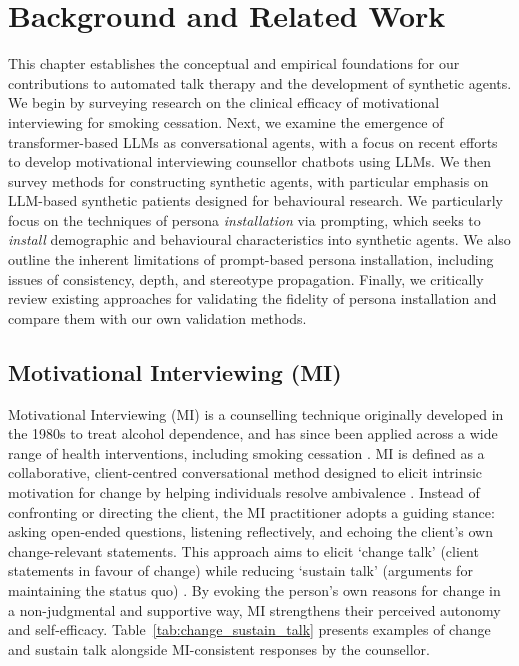 \chapter{Background and Related Work}
\label{ch:background}
This chapter establishes the conceptual and empirical foundations for our contributions to automated talk therapy and the development of synthetic agents. We begin by surveying research on the clinical efficacy of motivational interviewing for smoking cessation. Next, we examine the emergence of transformer-based LLMs as conversational agents, with a focus on recent efforts to develop motivational interviewing counsellor chatbots using LLMs. We then survey methods for constructing synthetic agents, with particular emphasis on LLM-based synthetic patients designed for behavioural research. We particularly focus on the techniques of persona \emph{installation} via prompting, which seeks to \emph{install} demographic and behavioural characteristics into synthetic agents. We also outline the inherent limitations of prompt-based persona installation, including issues of consistency, depth, and stereotype propagation. Finally, we critically review existing approaches for validating the fidelity of persona installation and compare them with our own validation methods.


\section{Motivational Interviewing (MI)}
Motivational Interviewing (MI) is a counselling technique originally developed in the 1980s to treat alcohol dependence, and has since been applied across a wide range of health interventions, including smoking cessation \cite{Miller1983, MillerRollnick2023}. MI is defined as a collaborative, client-centred conversational method designed to elicit intrinsic motivation for change by helping individuals resolve ambivalence \cite{MillerRollnick2002}. Instead of confronting or directing the client, the MI practitioner adopts a guiding stance: asking open-ended questions, listening reflectively, and echoing the client's own change-relevant statements. This approach aims to elicit `change talk' (client statements in favour of change) while reducing `sustain talk' (arguments for maintaining the status quo) \cite{MillerRose2009}. By evoking the person's own reasons for change in a non-judgmental and supportive way, MI strengthens their perceived autonomy and self-efficacy. Table~\ref{tab:change_sustain_talk} presents examples of change and sustain talk alongside MI-consistent responses by the counsellor.


